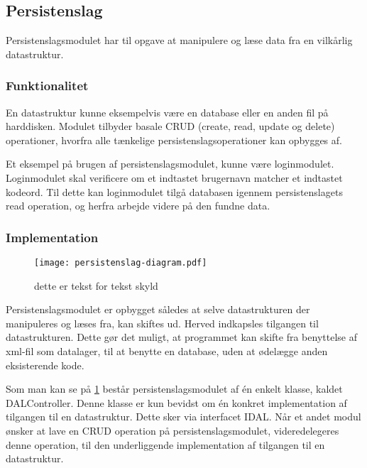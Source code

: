 \subsection{Persistenslag}
\label{sub:persistenslag}

Persistenslagsmodulet har til opgave at manipulere og læse data fra en vilkårlig datastruktur.

\subsubsection{Funktionalitet}
\label{ssub:persistenslag_funktionalitet}

En datastruktur kunne eksempelvis være en database eller en anden fil på harddisken. Modulet tilbyder basale CRUD (create, read, update og delete) operationer, hvorfra alle tænkelige persistenslagsoperationer kan opbygges af.

Et eksempel på brugen af persistenslagsmodulet, kunne være loginmodulet. Loginmodulet skal verificere om et indtastet brugernavn matcher et indtastet kodeord. Til dette kan loginmodulet tilgå databasen igennem persistenslagets read operation, og herfra arbejde videre på den fundne data.

\subsubsection{Implementation}
\label{ssub:persistenslag_implementation}
\begin{figure}
  \centering
  \texttt{[image: persistenslag-diagram.pdf]}
  \caption{dette er tekst for tekst skyld }
  \label{fig:permod}
\end{figure}

Persistenslagsmodulet er opbygget således at selve datastrukturen der manipuleres og læses fra, kan skiftes ud. Herved indkapsles tilgangen til datastrukturen. Dette gør det muligt, at programmet kan skifte fra benyttelse af xml-fil som datalager, til at benytte en database, uden at ødelægge anden eksisterende kode.

Som man kan se på \cref{fig:permod} består persistenslagsmodulet af én enkelt klasse, kaldet DALController. Denne klasse er kun bevidst om én konkret implementation af tilgangen til en datastruktur. Dette sker via interfacet IDAL. Når et andet modul ønsker at lave en CRUD operation på persistenslagsmodulet, videredelegeres denne operation, til den underliggende implementation af tilgangen til en datastruktur.